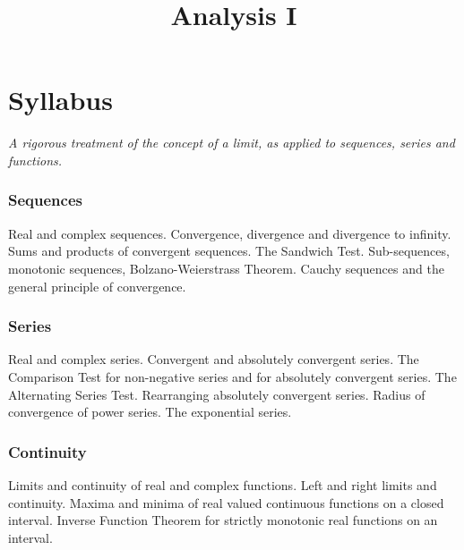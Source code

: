 \documentclass[twoside]{scrartcl}
\title{Analysis I}
\begin{document}
{






\section*{Syllabus}  

\textit{A rigorous treatment of the concept of a limit, as applied to sequences, series and functions.}

\subsubsection*{Sequences} Real and complex sequences. Convergence, divergence and divergence to infinity. Sums and products of convergent sequences. The Sandwich Test. Sub-sequences, monotonic sequences, Bolzano-Weierstrass Theorem. Cauchy sequences and the general principle of convergence.

\subsubsection*{Series} Real and complex series. Convergent and absolutely convergent series. The Comparison Test for non-negative series and for absolutely convergent series. The Alternating Series Test.  Rearranging absolutely convergent series. Radius of convergence of power series. The exponential series.

\subsubsection*{Continuity} Limits and continuity of real and complex functions. Left and right limits and continuity. Maxima
and minima of real valued continuous functions on a closed interval. Inverse Function Theorem for
strictly monotonic real functions on an interval. 

}
\end{document}
